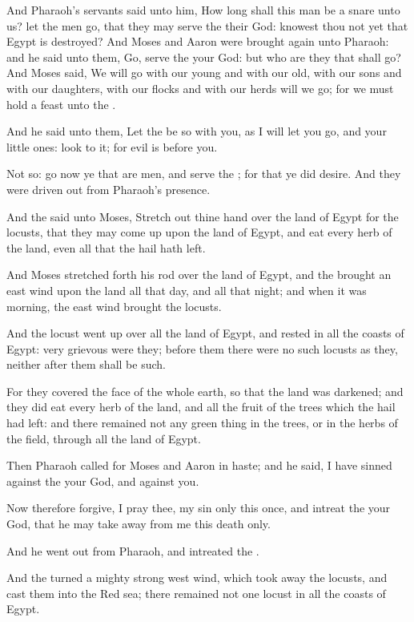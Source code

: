 \Verse And Pharaoh's servants said unto him, How long shall this man be a snare unto us? let the men go, that they may serve the \LORD their God: knowest thou not yet that Egypt is destroyed?  \Verse And Moses and Aaron were brought again unto Pharaoh: and he said unto them, Go, serve the \LORD your God: but who are they that shall go?  \Verse And Moses said, We will go with our young and with our old, with our sons and with our daughters, with our flocks and with our herds will we go; for we must hold a feast unto the \LORD.

\Verse And he said unto them, Let the \LORD be so with you, as I will let you go, and your little ones: look to it; for evil is before you.

\Verse Not so: go now ye that are men, and serve the \LORD; for that ye did desire. And they were driven out from Pharaoh's presence.

\Verse And the \LORD said unto Moses, Stretch out thine hand over the land of Egypt for the locusts, that they may come up upon the land of Egypt, and eat every herb of the land, even all that the hail hath left.

\Verse And Moses stretched forth his rod over the land of Egypt, and the \LORD brought an east wind upon the land all that day, and all that night; and when it was morning, the east wind brought the locusts.

\Verse And the locust went up over all the land of Egypt, and rested in all the coasts of Egypt: very grievous were they; before them there were no such locusts as they, neither after them shall be such.

\Verse For they covered the face of the whole earth, so that the land was darkened; and they did eat every herb of the land, and all the fruit of the trees which the hail had left: and there remained not any green thing in the trees, or in the herbs of the field, through all the land of Egypt.

\Verse Then Pharaoh called for Moses and Aaron in haste; and he said, I have sinned against the \LORD your God, and against you.

\Verse Now therefore forgive, I pray thee, my sin only this once, and intreat the \LORD your God, that he may take away from me this death only.

\Verse And he went out from Pharaoh, and intreated the \LORD.

\Verse And the \LORD turned a mighty strong west wind, which took away the locusts, and cast them into the Red sea; there remained not one locust in all the coasts of Egypt.

